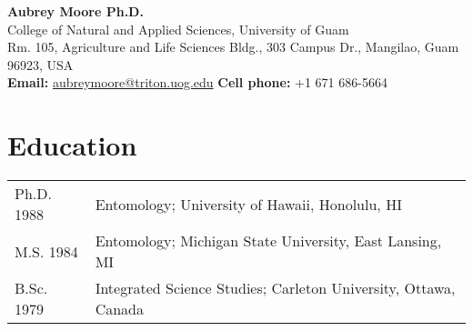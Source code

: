 \documentclass[letterpaper]{article}
\begin{document}
	
\fontsize{9}{11}\selectfont %

\begin{center}
\huge\textbf{Aubrey Moore Ph.D.}\\
\normalsize{College of Natural and Applied Sciences, University of Guam\\ 
Rm. 105, Agriculture and Life Sciences Bldg., 303 Campus Dr., Mangilao, Guam 96923, USA\\	
\textbf{Email:} \href{mailto:aubreymoore@triton.uog.edu}{aubreymoore@triton.uog.edu} \textbf{Cell phone:} +1 671 686-5664}
\end{center}

\section{Education}
\begin{tabular}{ll}
Ph.D. 1988 & Entomology;  University of Hawaii, Honolulu, HI \\
M.S. 1984 & Entomology;  Michigan State University, East Lansing, MI \\
B.Sc. 1979 & Integrated Science Studies; Carleton University, Ottawa, Canada
\end{tabular}
\end{document}
